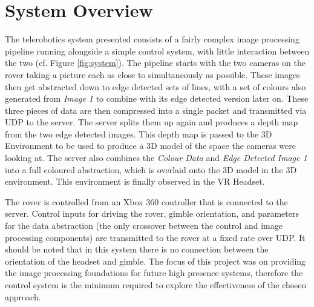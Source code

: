 \chapter{System Overview}
\label{chapter:system}

The telerobotics system presented consists of a fairly complex image processing pipeline running alongside a simple control system, with little interaction between the two (cf. Figure \ref{fig:system}). The pipeline starts with the two cameras on the rover taking a picture each as close to simultaneously as possible. These images then get abstracted down to edge detected sets of lines, with a set of colours also generated from \emph{Image 1} to combine with its edge detected version later on. These three pieces of data are then compressed into a single packet and transmitted via UDP \cite{postel1980user} to the server. The server splits them up again and produces a depth map from the two edge detected images. This depth map is passed to the 3D Environment to be used to produce a 3D model of the space the cameras were looking at. The server also combines the \emph{Colour Data} and \emph{Edge Detected Image 1} into a full coloured abstraction, which is overlaid onto the 3D model in the 3D environment. This environment is finally observed in the VR Headset.

The rover is controlled from an Xbox 360 controller \cite{360pad} that is connected to the server. Control inputs for driving the rover, gimble orientation, and parameters for the data abstraction (the only crossover between the control and image processing components) are transmitted to the rover at a fixed rate over UDP. It should be noted that in this system there is no connection between the orientation of the headset and gimble. The focus of this project was on providing the image processing foundations for future high presence systems, therefore the control system is the minimum required to explore the effectiveness of the chosen approach.

